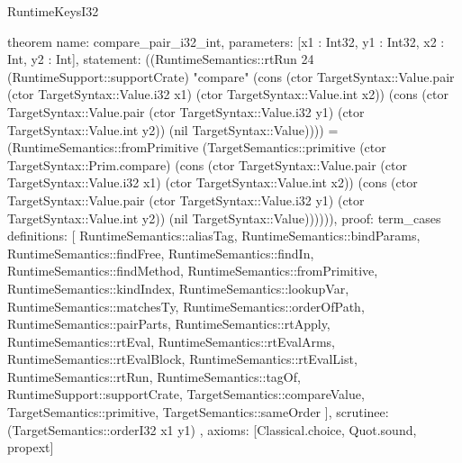 \begin{lexlean}{RuntimeKeysI32}
\begin{semanticmodule}
theorem{
  name: compare_pair_i32_int,
  parameters: [x1 : Int32, y1 : Int32, x2 : Int, y2 : Int],
  statement: ((RuntimeSemantics::rtRun 24 (RuntimeSupport::supportCrate) "compare" (cons (ctor TargetSyntax::Value.pair (ctor TargetSyntax::Value.i32 x1) (ctor TargetSyntax::Value.int x2)) (cons (ctor TargetSyntax::Value.pair (ctor TargetSyntax::Value.i32 y1) (ctor TargetSyntax::Value.int y2)) (nil TargetSyntax::Value)))) = (RuntimeSemantics::fromPrimitive (TargetSemantics::primitive (ctor TargetSyntax::Prim.compare) (cons (ctor TargetSyntax::Value.pair (ctor TargetSyntax::Value.i32 x1) (ctor TargetSyntax::Value.int x2)) (cons (ctor TargetSyntax::Value.pair (ctor TargetSyntax::Value.i32 y1) (ctor TargetSyntax::Value.int y2)) (nil TargetSyntax::Value)))))),
  proof: term_cases{
    definitions: [
      RuntimeSemantics::aliasTag,
      RuntimeSemantics::bindParams,
      RuntimeSemantics::findFree,
      RuntimeSemantics::findIn,
      RuntimeSemantics::findMethod,
      RuntimeSemantics::fromPrimitive,
      RuntimeSemantics::kindIndex,
      RuntimeSemantics::lookupVar,
      RuntimeSemantics::matchesTy,
      RuntimeSemantics::orderOfPath,
      RuntimeSemantics::pairParts,
      RuntimeSemantics::rtApply,
      RuntimeSemantics::rtEval,
      RuntimeSemantics::rtEvalArms,
      RuntimeSemantics::rtEvalBlock,
      RuntimeSemantics::rtEvalList,
      RuntimeSemantics::rtRun,
      RuntimeSemantics::tagOf,
      RuntimeSupport::supportCrate,
      TargetSemantics::compareValue,
      TargetSemantics::primitive,
      TargetSemantics::sameOrder
    ],
    scrutinee: (TargetSemantics::orderI32 x1 y1)
  },
  axioms: [Classical.choice, Quot.sound, propext]
}


\end{semanticmodule}
\end{lexlean}
